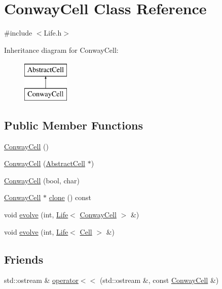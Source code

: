 \hypertarget{classConwayCell}{\section{Conway\-Cell Class Reference}
\label{classConwayCell}
}


{\ttfamily \#include $<$Life.\-h$>$}

Inheritance diagram for Conway\-Cell\-:\begin{figure}[H]
\begin{center}
\leavevmode
\includegraphics[height=2.000000cm]{classConwayCell}
\end{center}
\end{figure}
\subsection*{Public Member Functions}
\begin{DoxyCompactItemize}
\item 
\hyperlink{classConwayCell_aeff597ba7adcb28d4c386d075eddb196}{Conway\-Cell} ()
\item 
\hyperlink{classConwayCell_a2a95bc5f44490fcc91e40b6a5c98ab86}{Conway\-Cell} (\hyperlink{classAbstractCell}{Abstract\-Cell} $\ast$)
\item 
\hyperlink{classConwayCell_a5a3c45dac7c4de6119fb9d0dfdfab710}{Conway\-Cell} (bool, char)
\item 
\hyperlink{classConwayCell}{Conway\-Cell} $\ast$ \hyperlink{classConwayCell_a0fac73dc33d36053d1400430f1c980ce}{clone} () const 
\item 
void \hyperlink{classConwayCell_af5de668c6c40874a915da6335e030aa6}{evolve} (int, \hyperlink{classLife}{Life}$<$ \hyperlink{classConwayCell}{Conway\-Cell} $>$ \&)
\item 
void \hyperlink{classConwayCell_ad7204969de71ae212c67b5eafcd333f0}{evolve} (int, \hyperlink{classLife}{Life}$<$ \hyperlink{classCell}{Cell} $>$ \&)
\end{DoxyCompactItemize}
\subsection*{Friends}
\begin{DoxyCompactItemize}
\item 
std\-::ostream \& \hyperlink{classConwayCell_a30841fd52a1b9f1980a5e3345d7c6b9f}{operator$<$$<$} (std\-::ostream \&, const \hyperlink{classConwayCell}{Conway\-Cell} \&)
\end{DoxyCompactItemize}
